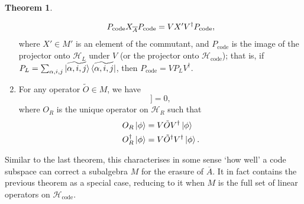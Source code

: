 \documentclass[12pt,a4paper]{report}
\numberwithin{equation}{section}
\newcommand{\ketbra}[2]{\ket{#1}\bra{#2}}
\newcommand{\ketbras}[1]{\ketbra{#1}{#1}}
\newcommand{\Pc}{P_{\text{code}}}
\newcommand{\Hcode}{\mathcal{H}_{\text{code}}}
\newcommand{\ol}[1]{\overline{#1}}
\theoremstyle{definition}
\theoremstyle{theorem}
\newtheorem{theorem}{Theorem}[section]
\theoremstyle{theorem}
\theoremstyle{example}
\theoremstyle{definition}
\begin{document}
\begin{theorem}
\begin{enumerate}
		\begin{equation}
			\Pc\Xabar\Pc=VX'V^{\dagger}\Pc,
		\end{equation}
		where $X'\in M'$ is an element of the commutant, and $\Pc$ is the image of the projector onto $\mathcal{H}_{L}$ under $V$ (or the projector onto $\Hcode$); that is, if $P_{L}=\sum_{\alpha,i,j}\ketbras{\widetilde{\alpha,i,j}}$, then $\Pc=VP_{L}V^{\dagger}$.
		\item For any operator $\tilde{O}\in M$, we have
		\begin{equation}
			[O_{R},\rho_{R\ol{A}}[\phi]]=0,
		\end{equation}
		where $O_{R}$ is the unique operator on $\mathcal{H}_{R}$ such that
		\begin{equation}
			\begin{aligned}
				O_{R}\ket{\phi}&=V\tilde{O}V^{\dagger}\ket{\phi}\\
				O_{R}^{\dagger}\ket{\phi}&=V\tilde{O}^{\dagger}V^{\dagger}\ket{\phi}.
			\end{aligned}
		\end{equation}
	\end{enumerate}
\end{theorem}
Similar to the last theorem, this characterises in some sense `how well' a code subspace can correct a subalgebra $M$ for the erasure of $\ol{A}$. It in fact contains the previous theorem as a special case, reducing to it when $M$ is the full set of linear operators on $\Hcode$.
\end{document}
